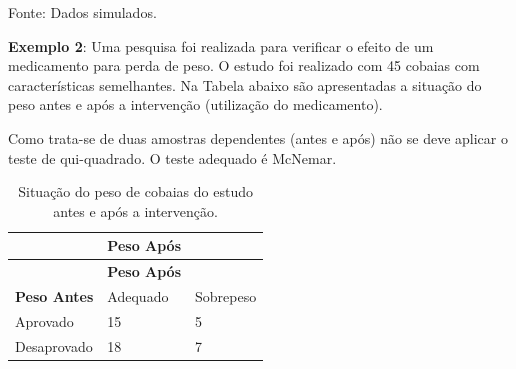 \documentclass[12pt,brazil,oneside]{book}
\begin{document}
Fonte: Dados simulados.

\textbf{Exemplo 2}: Uma pesquisa foi realizada para verificar o efeito de um medicamento para perda de peso. O estudo foi realizado com 45 cobaias com características semelhantes. Na Tabela abaixo são apresentadas a situação do peso antes e após a intervenção (utilização do medicamento).

Como trata-se de duas amostras dependentes (antes e após) não se deve aplicar o teste de qui-quadrado. O teste adequado é McNemar.

\begin{longtable}[]{@{}lll@{}}
\caption{\label{tab:sitcob}Situação do peso de cobaias do estudo antes e após a intervenção.}\tabularnewline
\toprule
\begin{minipage}[b]{0.35\columnwidth}\raggedright
\strut
\end{minipage} & \begin{minipage}[b]{0.25\columnwidth}\raggedright
\textbf{Peso Após}\strut
\end{minipage} & \begin{minipage}[b]{0.25\columnwidth}\raggedright
\strut
\end{minipage}\tabularnewline
\midrule
\endfirsthead
\toprule
\begin{minipage}[b]{0.35\columnwidth}\raggedright
\strut
\end{minipage} & \begin{minipage}[b]{0.25\columnwidth}\raggedright
\textbf{Peso Após}\strut
\end{minipage} & \begin{minipage}[b]{0.25\columnwidth}\raggedright
\strut
\end{minipage}\tabularnewline
\midrule
\endhead
\begin{minipage}[t]{0.35\columnwidth}\raggedright
\textbf{Peso Antes}\strut
\end{minipage} & \begin{minipage}[t]{0.25\columnwidth}\raggedright
Adequado\strut
\end{minipage} & \begin{minipage}[t]{0.25\columnwidth}\raggedright
Sobrepeso\strut
\end{minipage}\tabularnewline
\begin{minipage}[t]{0.35\columnwidth}\raggedright
Aprovado\strut
\end{minipage} & \begin{minipage}[t]{0.25\columnwidth}\raggedright
15\strut
\end{minipage} & \begin{minipage}[t]{0.25\columnwidth}\raggedright
5\strut
\end{minipage}\tabularnewline
\begin{minipage}[t]{0.35\columnwidth}\raggedright
Desaprovado\strut
\end{minipage} & \begin{minipage}[t]{0.25\columnwidth}\raggedright
18\strut
\end{minipage} & \begin{minipage}[t]{0.25\columnwidth}\raggedright
7\strut
\end{minipage}\tabularnewline
\bottomrule
\end{longtable}
\end{document}
